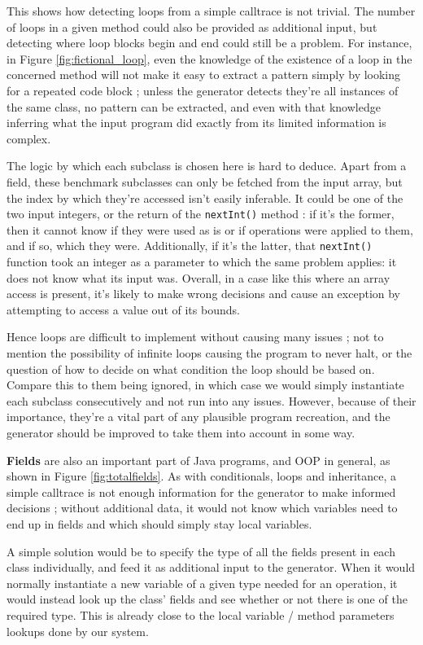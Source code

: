 \documentclass[12pt]{article}
\begin{document}
This shows how detecting loops from a simple calltrace is not trivial. The number of loops in a given method could also be provided as additional input, but detecting where loop blocks begin and end could still be a problem. For instance, in Figure \ref{fig:fictional_loop}, even the knowledge of the existence of a loop in the concerned method will not make it easy to extract a pattern simply by looking for a repeated code block ; unless the generator detects they're all instances of the same class, no pattern can be extracted, and even with that knowledge inferring what the input program did exactly from its limited information is complex. 

The logic by which each subclass is chosen here is hard to deduce. Apart from a field, these benchmark subclasses can only be fetched from the input array, but the index by which they're accessed isn't easily inferable. It could be one of the two input integers, or the return of the \texttt{nextInt()} method : if it's the former, then it cannot know if they were used as is or if operations were applied to them, and if so, which they were. Additionally, if it's the latter, that \texttt{nextInt()} function took an integer as a parameter to which the same problem applies: it does not know what its input was. Overall, in a case like this where an array access is present, it's likely to make wrong decisions and cause an exception by attempting to access a value out of its bounds.

Hence loops are difficult to implement without causing many issues ; not to mention the possibility of infinite loops causing the program to never halt, or the question of how to decide on what condition the loop should be based on. Compare this to them being ignored, in which case we would simply instantiate each subclass consecutively and not run into any issues. However, because of their importance, they're a vital part of any plausible program recreation, and the generator should be improved to take them into account in some way.

\bigskip
\textbf{Fields} are also an important part of Java programs, and OOP in general, as shown in Figure \ref{fig:totalfields}. As with conditionals, loops and inheritance, a simple calltrace is not enough information for the generator to make informed decisions ; without additional data, it would not know which variables need to end up in fields and which should simply stay local variables.

A simple solution would be to specify the type of all the fields present in each class individually, and feed it as additional input to the generator. When it would normally instantiate a new variable of a given type needed for an operation, it would instead look up the class' fields and see whether or not there is one of the required type. This is already close to the local variable / method parameters lookups done by our system.
\end{document}
